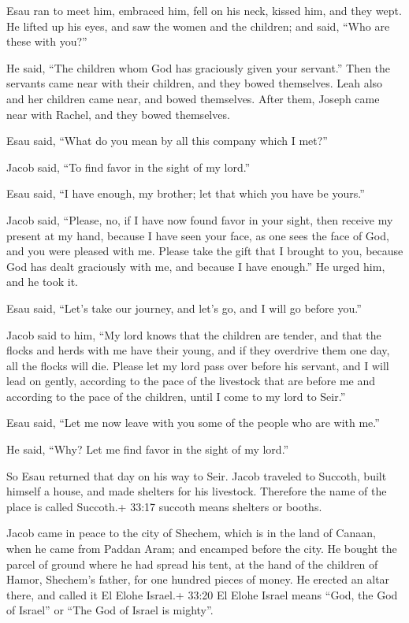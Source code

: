  Esau ran to meet him, embraced him, fell on his neck,
kissed him, and they wept.  He lifted up his eyes, and saw
the women and the children; and said, ``Who are these with you?''

He said, ``The children whom God has graciously given your servant.''
 Then the servants came near with their children, and they
bowed themselves.  Leah also and her children came near, and
bowed themselves. After them, Joseph came near with Rachel, and they
bowed themselves.

 Esau said, ``What do you mean by all this company which I
met?''

Jacob said, ``To find favor in the sight of my lord.''

 Esau said, ``I have enough, my brother; let that which you
have be yours.''

 Jacob said, ``Please, no, if I have now found favor in
your sight, then receive my present at my hand, because I have seen your
face, as one sees the face of God, and you were pleased with me.
 Please take the gift that I brought to you, because God
has dealt graciously with me, and because I have enough.'' He urged him,
and he took it.

 Esau said, ``Let's take our journey, and let's go, and I
will go before you.''

 Jacob said to him, ``My lord knows that the children are
tender, and that the flocks and herds with me have their young, and if
they overdrive them one day, all the flocks will die. 
Please let my lord pass over before his servant, and I will lead on
gently, according to the pace of the livestock that are before me and
according to the pace of the children, until I come to my lord to
Seir.''

 Esau said, ``Let me now leave with you some of the people
who are with me.''

He said, ``Why? Let me find favor in the sight of my lord.''

 So Esau returned that day on his way to Seir.
 Jacob traveled to Succoth, built himself a house, and made
shelters for his livestock. Therefore the name of the place is called
Succoth.+ 33:17 succoth means shelters or booths.

 Jacob came in peace to the city of Shechem, which is in
the land of Canaan, when he came from Paddan Aram; and encamped before
the city.  He bought the parcel of ground where he had
spread his tent, at the hand of the children of Hamor, Shechem's father,
for one hundred pieces of money.  He erected an altar
there, and called it El Elohe Israel.+ 33:20 El Elohe Israel means
``God, the God of Israel'' or ``The God of Israel is mighty''.


